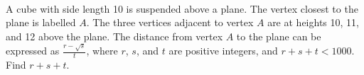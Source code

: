 \documentclass[mast]{lucky}
\begin{document}
\\
\begin{prob}[AIME I 2011/13]{13}
A cube with side length 10 is suspended above a plane. The vertex closest to the plane is labelled $A$. The three vertices adjacent to vertex $A$ are at heights 10, 11, and 12 above the plane. The distance from vertex $A$ to the plane can be expressed as $$, where $r$, $s$, and $t$ are positive integers, and $r+s+t<1000$. Find $r+s+t$.
\end{prob}
\end{document}
